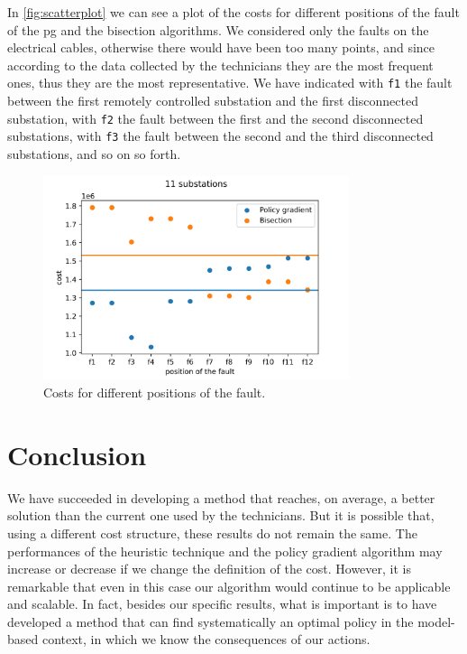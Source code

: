 In \autoref{fig:scatterplot} we can see a plot of the costs for different positions of the fault of the \acrshort{pg} and the bisection algorithms. We considered only the faults on the electrical cables, otherwise there would have been too many points, and since according to the data collected by the technicians they are the most frequent ones, thus they are the most representative. We have indicated with \texttt{f1} the fault between the first remotely controlled substation and the first disconnected substation, with \texttt{f2} the fault between the first and the second disconnected substations, with \texttt{f3} the fault between the second and the third disconnected substations, and so on so forth.

\begin{figure}[htb]
    \centering
    \includegraphics[width=0.8\textwidth]{chapters/figures/scatterplot.png}
    \caption{Costs for different positions of the fault.}
    \label{fig:scatterplot}
\end{figure}

\section{Conclusion}

We have succeeded in developing a method that reaches, on average, a better solution than the current one used by the technicians. But it is possible that, using a different cost structure, these results do not remain the same. The performances of the heuristic technique and the policy gradient algorithm may increase or decrease if we change the definition of the cost. However, it is remarkable that even in this case our algorithm would continue to be applicable and scalable. In fact, besides our specific results, what is important is to have developed a method that can find systematically an optimal policy in the model-based context, in which we know the consequences of our actions.

